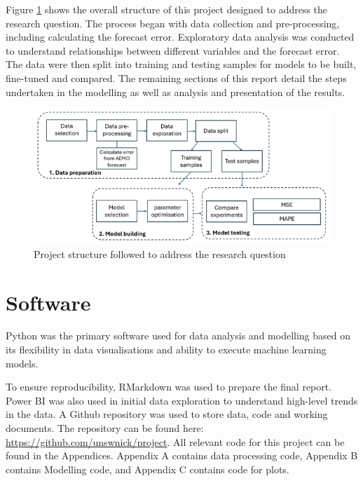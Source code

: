 \documentclass[mstat,12pt]{unswthesis}
\begin{document}
Figure \ref{fig:modelDiagram} shows the overall structure of this project designed to address the research question. The process began with data collection and pre-processing, including calculating the forecast error. Exploratory data analysis was conducted to understand relationships between different variables and the forecast error. The data were then split into training and testing samples for models to be built, fine-tuned and compared. The remaining sections of this report detail the steps undertaken in the modelling as well as analysis and presentation of the results.

\begin{figure}
\includegraphics[width=1\linewidth,height=0.3\textheight]{images/MaterialMethods} \caption{Project structure followed to address the research question}\label{fig:modelDiagram}
\end{figure}

\section{Software}\label{software}

Python was the primary software used for data analysis and modelling based on its flexibility in data visualisations and ability to execute machine learning models.

\bigskip

To ensure reproducibility, RMarkdown was used to prepare the final report. Power BI was also used in initial data exploration to understand high-level trends in the data. A Github repository was used to store data, code and working documents. The repository can be found here: \url{https://github.com/unswnick/project}. All relevant code for this project can be found in the Appendices. Appendix A contains data processing code, Appendix B contains Modelling code, and Appendix C contains code for plots.

\bigskip
\end{document}
